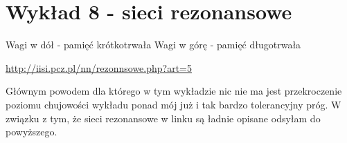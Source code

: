\section{Wykład 8 - sieci rezonansowe}

Wagi w dół - pamięć krótkotrwała
Wagi w górę - pamięć długotrwała

\url{http://iisi.pcz.pl/nn/rezonnsowe.php?art=5}

Głównym powodem dla którego w tym wykładzie nic nie ma jest przekroczenie poziomu chujowości wykładu ponad mój już i tak
bardzo tolerancyjny próg. W związku z tym, że sieci rezonansowe w linku są ładnie opisane odsyłam do powyższego.